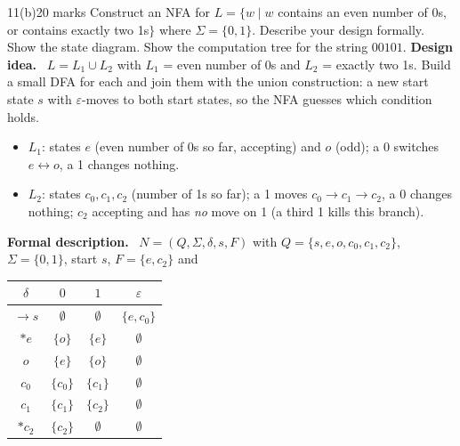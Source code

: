 \documentclass[10.5pt,a4paper]{article}
\newcommand{\ansh}[1]{\textbf{\color{exborder}#1}\ }
\newcommand{\eps}{\varepsilon}
\begin{document}
\begin{qa}{11(b)}{20 marks}
Construct an NFA for $L=\{w\mid w$ contains an even number of 0s, or contains exactly two 1s$\}$ where $\Sigma=\{0,1\}$. Describe your design formally.
Show the state diagram. Show the computation tree for the string $00101$.
\tcblower
\ansh{Design idea.} $L=L_1\cup L_2$ with $L_1$ = even number of 0s and $L_2$ = exactly two 1s. Build a small DFA for each and join them with the
union construction: a new start state $s$ with $\eps$-moves to both start states, so the NFA guesses which condition holds.
\begin{itemize}
\item $L_1$: states $e$ (even number of 0s so far, accepting) and $o$ (odd); a 0 switches $e\leftrightarrow o$, a 1 changes nothing.
\item $L_2$: states $c_0,c_1,c_2$ (number of 1s so far); a 1 moves $c_0\to c_1\to c_2$, a 0 changes nothing; $c_2$ accepting and has
\emph{no} move on 1 (a third 1 kills this branch).
\end{itemize}
\ansh{Formal description.} $N=(Q,\Sigma,\delta,s,F)$ with $Q=\{s,e,o,c_0,c_1,c_2\}$, $\Sigma=\{0,1\}$, start $s$, $F=\{e,c_2\}$ and
\begin{center}\small
\begin{tabular}{c|ccc}
$\delta$ & $0$ & $1$ & $\eps$\\\hline
$\to s$ & $\emptyset$ & $\emptyset$ & $\{e,c_0\}$\\
$*e$ & $\{o\}$ & $\{e\}$ & $\emptyset$\\
$o$ & $\{e\}$ & $\{o\}$ & $\emptyset$\\
$c_0$ & $\{c_0\}$ & $\{c_1\}$ & $\emptyset$\\
$c_1$ & $\{c_1\}$ & $\{c_2\}$ & $\emptyset$\\
$*c_2$ & $\{c_2\}$ & $\emptyset$ & $\emptyset$
\end{tabular}
\end{center}
\begin{center}
\end{center}
\end{qa}
\end{document}
